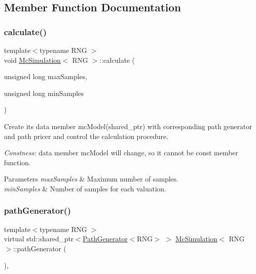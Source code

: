 \subsection{Member Function Documentation}
\hypertarget{class_mc_simulation_acaa09060a9ee90e0cc3631d8b30ebae0}{}\label{class_mc_simulation_acaa09060a9ee90e0cc3631d8b30ebae0} 
\subsubsection{\texorpdfstring{calculate()}{calculate()}}
{\footnotesize\ttfamily template$<$typename R\+NG $>$ \\
void \hyperlink{class_mc_simulation}{Mc\+Simulation}$<$ R\+NG $>$\+::calculate (\begin{DoxyParamCaption}\item[{unsigned long}]{max\+Samples,  }\item[{unsigned long}]{min\+Samples }\end{DoxyParamCaption})}



Create its data member mc\+Model(shared\+\_\+ptr) with corresponding path generator and path pricer and control the calculation procedure. 

{\itshape Constness\+:} data member mc\+Model will change, so it cannot be const member function. 
\begin{DoxyParams}{Parameters}
{\em max\+Samples} & Maximum number of samples. \\
\hline
{\em min\+Samples} & Number of samples for each valuation. \\
\hline
\end{DoxyParams}
\hypertarget{class_mc_simulation_a44086a1efd452d8644c9f2e52417038f}{}\label{class_mc_simulation_a44086a1efd452d8644c9f2e52417038f} 
\subsubsection{\texorpdfstring{path\+Generator()}{pathGenerator()}}
{\footnotesize\ttfamily template$<$typename R\+NG $>$ \\
virtual std\+::shared\+\_\+ptr$<$\hyperlink{class_path_generator}{Path\+Generator}$<$R\+NG$>$ $>$ \hyperlink{class_mc_simulation}{Mc\+Simulation}$<$ R\+NG $>$\+::path\+Generator (\begin{DoxyParamCaption}{ }\end{DoxyParamCaption})\hspace{0.3cm}{\ttfamily [private]}, {}}



